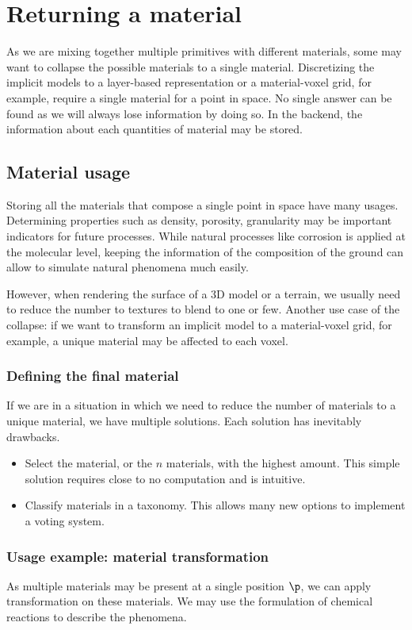 \section{Returning a material}
As we are mixing together multiple primitives with different materials, some may want to collapse the possible materials to a single material. Discretizing the implicit models to a layer-based representation or a material-voxel grid, for example, require a single material for a point in space. No single answer can be found as we will always lose information by doing so. In the backend, the information about each quantities of material may be stored.

\subsection{Material usage}
Storing all the materials that compose a single point in space have many usages. Determining properties such as density, porosity, granularity may be important indicators for future processes. While natural processes like corrosion is applied at the molecular level, keeping the information of the composition of the ground can allow to simulate natural phenomena much easily.

However, when rendering the surface of a 3D model or a terrain, we usually need to reduce the number to textures to blend to one or few. Another use case of the collapse: if we want to transform an implicit model to a material-voxel grid, for example, a unique material may be affected to each voxel.

\subsubsection{Defining the final material}
If we are in a situation in which we need to reduce the number of materials to a unique material, we have multiple solutions. Each solution has inevitably drawbacks.
\begin{itemize}
    \item Select the material, or the $n$ materials, with the highest amount. This simple solution requires close to no computation and is intuitive.
    \item Classify materials in a taxonomy. This allows many new options to implement a voting system.
\end{itemize}

\subsubsection{Usage example: material transformation}
As multiple materials may be present at a single position $\p$, we can apply transformation on these materials. We may use the formulation of chemical reactions to describe the phenomena.

